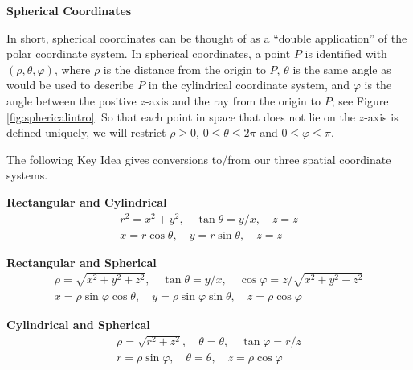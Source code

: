 \noindent\textbf{\large Spherical Coordinates}

In short, spherical coordinates can be thought of as a ``double application'' of the polar coordinate system. In spherical coordinates, a point $P$ is identified with $(\rho,\theta,\varphi)$, where $\rho$ is the distance from the origin to $P$, $\theta$ is the same angle as would be used to describe $P$ in the cylindrical coordinate system, and $\varphi$ is the angle between the positive $z$-axis and the ray from the origin to $P$; see Figure \ref{fig:sphericalintro}. So that each point in space that does not lie on the $z$-axis is defined uniquely, we will restrict $\rho \geq 0$, $0 \leq \theta \leq 2\pi$ and $0 \leq \varphi \leq \pi$.

The following Key Idea gives conversions to/from our three spatial coordinate systems.

{\textbf{Rectangular and Cylindrical}
$$\begin{array}{c}
r^2 = x^2+y^2,\quad \tan \theta = y/x,\quad z=z\\
x=r\cos \theta, \quad y=r\sin\theta,\quad z=z
\end{array}$$

\textbf{Rectangular and Spherical}
$$\begin{array}{c}
\rho = \sqrt{x^2+y^2+z^2},\quad \tan \theta = y/x,\quad \cos \varphi = z/\sqrt{x^2+y^2+z^2}\\
x=\rho\sin\varphi\cos\theta,\quad y=\rho\sin\varphi\sin\theta,\quad z=\rho\cos\varphi
\end{array}$$

\textbf{Cylindrical and Spherical }
$$\begin{array}{c}
\rho=\sqrt{r^2+z^2}, \quad \theta = \theta,\quad \tan \varphi = r/z \\
r=\rho \sin \varphi, \quad \theta = \theta, \quad z=\rho\cos\varphi
\end{array}$$ 
}

